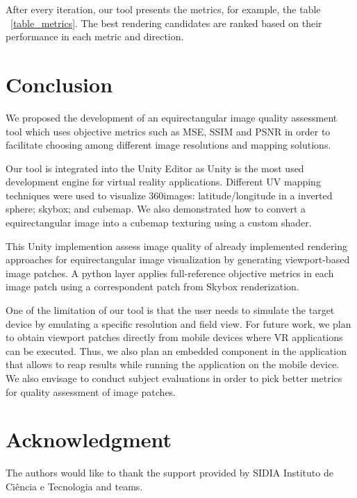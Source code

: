 \documentclass[10pt,conference,pdftex]{IEEEtran}
\begin{document}
After every iteration, our tool presents the metrics, for example, the table ~\ref{table_metrics}. The best rendering candidates are ranked based on their performance in each metric and direction.

\section{Conclusion}\label{sec:conclusion}

We proposed the development of an equirectangular image quality assessment tool which uses objective metrics such as MSE, SSIM and PSNR in order to facilitate choosing among different image resolutions and mapping solutions.

Our tool is integrated into the Unity Editor as Unity is the most used development engine for virtual reality applications. Different UV mapping techniques were used to visualize 360\degree images: latitude/longitude in a inverted sphere; skybox; and cubemap. We also demonstrated how to convert a equirectangular image into a cubemap texturing using a custom shader.

This Unity implemention assess image quality of already implemented rendering approaches for equirectangular image visualization by generating viewport-based image patches. A python layer applies full-reference objective metrics in each image patch using a correspondent patch from Skybox renderization.

One of the limitation of our tool is that the user needs to simulate the target device by emulating a specific resolution and field view. For future work, we plan to obtain viewport patches directly from mobile devices where VR applications can be executed. Thus, we also plan an embedded component in the application that allows to reap results while running the application on the mobile device. We also envisage to conduct subject evaluations in order to pick better metrics for quality assessment of image patches.


\section*{Acknowledgment}
The authors would like to thank the support provided by SIDIA Instituto de Ciência e Tecnologia and teams.



\end{document}
